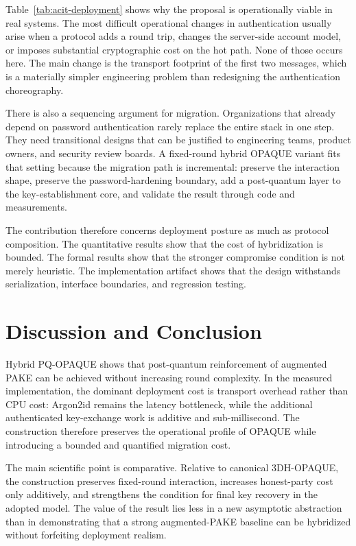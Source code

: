 \documentclass[conference]{IEEEtran}
\begin{document}
Table~\ref{tab:acit-deployment} shows why the proposal is operationally viable in real systems. The most difficult operational changes in authentication usually arise when a protocol adds a round trip, changes the server-side account model, or imposes substantial cryptographic cost on the hot path. None of those occurs here. The main change is the transport footprint of the first two messages, which is a materially simpler engineering problem than redesigning the authentication choreography.

There is also a sequencing argument for migration. Organizations that already depend on password authentication rarely replace the entire stack in one step. They need transitional designs that can be justified to engineering teams, product owners, and security review boards. A fixed-round hybrid OPAQUE variant fits that setting because the migration path is incremental: preserve the interaction shape, preserve the password-hardening boundary, add a post-quantum layer to the key-establishment core, and validate the result through code and measurements.

The contribution therefore concerns deployment posture as much as protocol composition. The quantitative results show that the cost of hybridization is bounded. The formal results show that the stronger compromise condition is not merely heuristic. The implementation artifact shows that the design withstands serialization, interface boundaries, and regression testing.

\section{Discussion and Conclusion}

Hybrid PQ-OPAQUE shows that post-quantum reinforcement of augmented PAKE can be achieved without increasing round complexity. In the measured implementation, the dominant deployment cost is transport overhead rather than CPU cost: Argon2id remains the latency bottleneck, while the additional authenticated key-exchange work is additive and sub-millisecond. The construction therefore preserves the operational profile of OPAQUE while introducing a bounded and quantified migration cost.

The main scientific point is comparative. Relative to canonical 3DH-OPAQUE, the construction preserves fixed-round interaction, increases honest-party cost only additively, and strengthens the condition for final key recovery in the adopted model. The value of the result lies less in a new asymptotic abstraction than in demonstrating that a strong augmented-PAKE baseline can be hybridized without forfeiting deployment realism.
\end{document}
